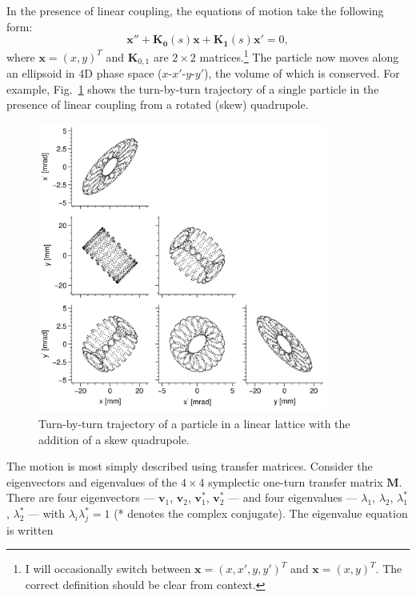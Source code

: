 In the presence of linear coupling, the equations of motion take the following form:
%
\begin{equation}\label{eq:single_particle_eom_coupled}
    \mathbf{x}'' + \mathbf{K_0}(s) \mathbf{x} + \mathbf{K_1}(s) \mathbf{x}' = 0,
\end{equation}
%
where $\mathbf{x} = (x, y)^T$ and $\mathbf{K}_{0, 1}$ are $2 \times 2$ matrices.\footnote{I will occasionally switch between $\mathbf{x} = (x, x', y, y')^T$ and $\mathbf{x} = (x, y)^T$. The correct definition should be clear from context.} The particle now moves along an ellipsoid in 4D phase space ($x$-$x'$-$y$-$y'$), the volume of which is conserved. For example, Fig.~\ref{fig:skew_quad_single_particle_tbt} shows the turn-by-turn trajectory of a single particle in the presence of linear coupling from a rotated (skew) quadrupole.
%
\begin{figure}[!p]
    \centering
    \includegraphics[width=0.85\textwidth]{Images/chapter1/skew_quad_single_particle_tbt.png}
    \caption{Turn-by-turn trajectory of a particle in a linear lattice with the addition of a skew quadrupole.}
    \label{fig:skew_quad_single_particle_tbt}
\end{figure}
%
The motion is most simply described using transfer matrices. Consider the eigenvectors and eigenvalues of the $4 \times 4$ symplectic one-turn transfer matrix $\mathbf{M}$. There are four eigenvectors — $\mathbf{v}_1$, $\mathbf{v}_2$, $\mathbf{v}_1^*$, $\mathbf{v}_2^*$ — and four eigenvalues — $\lambda_1$, $\lambda_2$, $\lambda_1^*$, $\lambda_2^*$ — with $\lambda_i\lambda_j^* = 1$ (* denotes the complex conjugate). The eigenvalue equation is written
